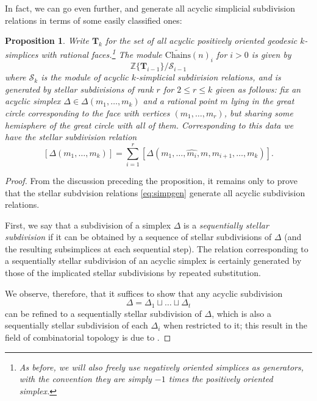 \documentclass[10pt]{amsart}
\newtheorem{prop}[thm]{Proposition}
\theoremstyle{definition}
\newcommand{\cS}{\mathcal{S}}
\newcommand{\Chains}{\mathrm{Chains}}
\numberwithin{equation}{section}
\begin{document}
    In fact, we can go even further, and generate all acyclic simplicial subdivision relations in terms of some easily classified ones:
    \begin{prop} \label{prop:simplesub}
        Write $\mathbf{T}_k$ for the set of all acyclic positively oriented geodesic $k$-simplices with rational faces.\footnote{As before, we will also freely use negatively oriented simplices as generators, with the convention they are simply $-1$ times the positively oriented simplex.} The module $\widetilde{\Chains}(n)_i$ for $i>0$ is given by 
        \[
        \mathbb{Z}\{\mathbf{T}_{i-1}\}/\cS_{i-1}
        \]
        where $\cS_k$ is the module of acyclic $k$-simplicial subdivision relations, and is generated by \emph{stellar subdivisions} of rank $r$ for $2\le r\le k$ given as follows: fix an acyclic simplex $\Delta\in \Delta(m_1,\ldots, m_k)$ and a rational point $m$ lying in the great circle corresponding to the face with vertices $(m_1,\ldots, m_{r})$, but sharing some hemisphere of the great circle with all of them. Corresponding to this data we have the \emph{stellar} subdivision relation
        \begin{equation}\label{eq:simpgen}
        [\Delta(m_1,\ldots, m_k)]=\sum_{i=1}^r [\Delta(m_1,\ldots, \hat{m_i},m,m_{i+1},\ldots, m_k)].
        \end{equation}
    \end{prop}
    \begin{proof}
        From the discussion preceding the proposition, it remains only to prove that the stellar subdvision relations \eqref{eq:simpgen} generate all acyclic subdivision relations.

        First, we say that a subdivision of a simplex $\Delta$ is a \emph{sequentially stellar subdivision} if it can be obtained by a sequence of stellar subdivisions of $\Delta$ (and the resulting subsimplices at each sequential step). The relation corresponding to a sequentially stellar subdivision of an acyclic simplex is certainly generated by those of the implicated stellar subdivisions by repeated substitution.

        We observe, therefore, that it suffices to show that any acyclic subdivision         
        \[
        \Delta = \Delta_1\sqcup \ldots \sqcup \Delta_t
        \]
        can be refined to a sequentially stellar subdivision of $\Delta$, which is also a sequentially stellar subdivision of each $\Delta_i$ when restricted to it; this result in the field of combinatorial topology is due to \cite{New}.
    \end{proof}
    
\end{document}
